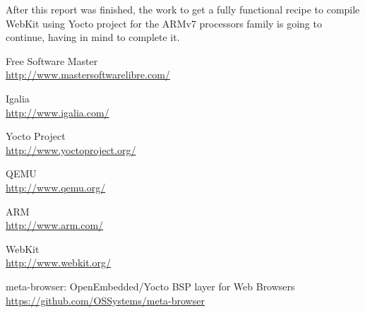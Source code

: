 \documentclass[a4paper,11pt,openany]{report}
\begin{document}
After this report was finished, the work to get a fully functional recipe to compile WebKit using Yocto project for the ARMv7 processors family is going to continue, having in mind to complete it.

\begin{thebibliography}{ZZ}

Free Software Master\\
\url{http://www.mastersoftwarelibre.com/}

Igalia\\
\url{http://www.igalia.com/}

Yocto Project\\
\url{http://www.yoctoproject.org/}

QEMU\\
\url{http://www.qemu.org/}

ARM\\
\url{http://www.arm.com/}

WebKit\\
\url{http://www.webkit.org/}

meta-browser: OpenEmbedded/Yocto BSP layer for Web Browsers\\
\url{https://github.com/OSSystems/meta-browser}

\end{thebibliography}
\end{document}
